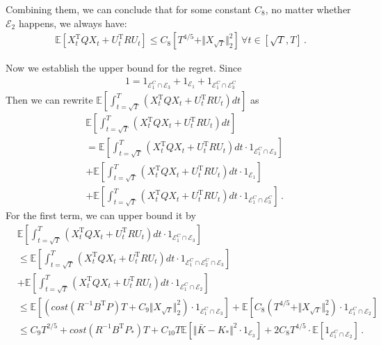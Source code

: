 \documentclass{article}
\theoremstyle{definition}
\begin{document}
Combining them, we can conclude that for some constant $C_{8}$, no matter whether $\mathcal{E}_{2}$ happens, we always have:
\begin{align*}
\mathbb{E}\left[X^{\mathrm{T}}_{t}QX_{t}+U^{\mathrm{T}}_{t}RU_{t}\right]\leq C_{8}\left[T^{4/5}+\Vert X_{\sqrt{T}}\Vert^{2}_{2}\right]\, \forall t\in[\sqrt{T},T]\,.
\end{align*}

Now we establish the upper bound for the regret. Since
\begin{align*}
1=1_{\mathcal{E}^{C}_{1}\cap \mathcal{E}_{3}}+1_{\mathcal{E}_{1}}+1_{\mathcal{E}^{C}_{1}\cap\mathcal{E}^{C}_{3}}
\end{align*}
Then we can rewrite $\mathbb{E}\left[\int_{t=\sqrt{T}}^{T}\left(X^{\mathrm{T}}_{t}QX_{t}+U^{\mathrm{T}}_{t}RU_{t}\right)dt\right]$ as
\begin{align*}
&\mathbb{E}\left[\int_{t=\sqrt{T}}^{T}\left(X^{\mathrm{T}}_{t}QX_{t}+U^{\mathrm{T}}_{t}RU_{t}\right)dt\right]\\
&=\mathbb{E}\left[\int_{t=\sqrt{T}}^{T}\left(X^{\mathrm{T}}_{t}QX_{t}+U^{\mathrm{T}}_{t}RU_{t}\right)dt\cdot 1_{\mathcal{E}^{C}_{1}\cap \mathcal{E}_{3}}\right]\\
&+\mathbb{E}\left[\int_{t=\sqrt{T}}^{T}\left(X^{\mathrm{T}}_{t}QX_{t}+U^{\mathrm{T}}_{t}RU_{t}\right)dt\cdot 1_{\mathcal{E}_{1}} \right]\\
&+\mathbb{E}\left[\int_{t=\sqrt{T}}^{T}\left(X^{\mathrm{T}}_{t}QX_{t}+U^{\mathrm{T}}_{t}RU_{t}\right)dt\cdot1_{\mathcal{E}^{C}_{1}\cap\mathcal{E}^{C}_{3}} \right]\,.
\end{align*}
For the first term, we can upper bound it by
\begin{align*}
&\mathbb{E}\left[\int_{t=\sqrt{T}}^{T}\left(X^{\mathrm{T}}_{t}QX_{t}+U^{\mathrm{T}}_{t}RU_{t}\right)dt\cdot 1_{\mathcal{E}^{C}_{1}\cap \mathcal{E}_{3}}\right]\\
&\leq \mathbb{E}\left[\int_{t=\sqrt{T}}^{T}\left(X^{\mathrm{T}}_{t}QX_{t}+U^{\mathrm{T}}_{t}RU_{t}\right)dt\cdot 1_{\mathcal{E}^{C}_{1}\cap \mathcal{E}^{C}_{2}\cap\mathcal{E}_{3}}\right]\\
&+\mathbb{E}\left[\int_{t=\sqrt{T}}^{T}\left(X^{\mathrm{T}}_{t}QX_{t}+U^{\mathrm{T}}_{t}RU_{t}\right)dt\cdot 1_{\mathcal{E}^{C}_{1}\cap \mathcal{E}_{2}}\right]\\
&\leq \mathbb{E}\left[\left(cost\left(R^{-1}B^{\mathrm{T}}P\right)T+C_{9}\Vert X_{\sqrt{T}}\Vert^{2}_{2}\right) \cdot 1_{\mathcal{E}^{C}_{1}\cap\mathcal{E}_{3}}\right]
+\mathbb{E}\left[C_{8}\left(T^{4/5}+\Vert X_{\sqrt{T}}\Vert^{2}_{2}\right)\cdot 1_{\mathcal{E}^{C}_{1}\cap \mathcal{E}_{2}}\right]\\
&\leq C_{9}T^{2/5}+cost(R^{-1}B^{\mathrm{T}}P_{*})T+C_{10}T\mathbb{E}\left[\Vert \bar{K}-K_{*}\Vert^{2}\cdot 1_{\mathcal{E}_{3}}\right] +2C_{8}T^{4/5}\cdot \mathbb{E}\left[1_{\mathcal{E}^{C}_{1}\cap \mathcal{E}_{2}}\right]\,.
\end{align*}
\end{document}
